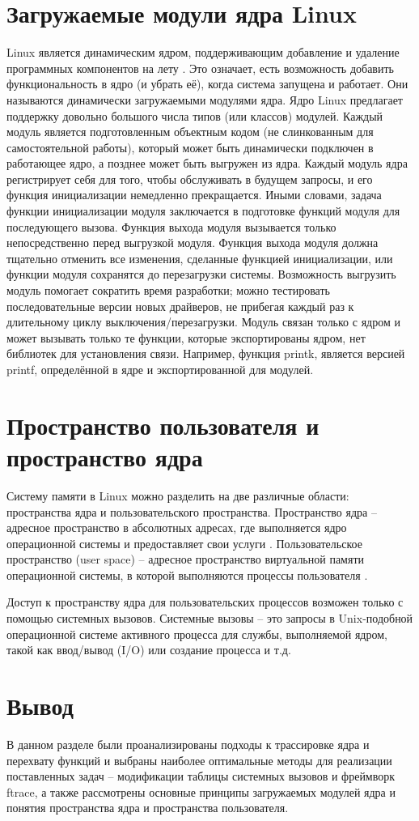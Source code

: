 \section{Загружаемые модули ядра Linux}
	Linux является динамическим ядром, 
	поддерживающим добавление и удаление программных компонентов на лету \cite{anatomy-linux-kernel}.
	Это означает, есть возможность добавить функциональность в ядро (и убрать её), когда система запущена и работает.
	Они называются динамически загружаемыми модулями ядра.
	Ядро Linux предлагает поддержку довольно большого числа типов (или классов) модулей.
	Каждый модуль является подготовленным объектным кодом (не слинкованным для самостоятельной работы),
	который может быть динамически подключен в работающее ядро, а позднее может быть выгружен из ядра.
	Каждый модуль ядра регистрирует себя для того, чтобы обслуживать в будущем запросы,
	и его функция инициализации немедленно прекращается. 
	Иными словами, задача функции инициализации модуля заключается в подготовке функций модуля для последующего вызова.
	Функция выхода модуля вызывается только непосредственно перед выгрузкой модуля. 
	Функция выхода модуля должна тщательно отменить все изменения, сделанные функцией инициализации, 
	или функции модуля сохранятся до перезагрузки системы. 
	Возможность выгрузить модуль помогает сократить время разработки; 
	можно тестировать последовательные версии новых драйверов, 
	не прибегая каждый раз к длительному циклу выключения/перезагрузки. 
	Модуль связан только с ядром и может вызывать только те функции, 
	которые экспортированы ядром, нет библиотек для установления связи. 
	Например, функция printk, является версией printf, 
	определённой в ядре и экспортированной для модулей.
	
\section{Пространство пользователя и пространство ядра}
	Систему памяти в Linux можно разделить на две различные области: пространства ядра и пользовательского пространства.
	Пространство ядра -- адресное пространство в абсолютных адресах,
	где выполняется ядро операционной системы и предоставляет свои услуги \cite{linux-kernel-space}.
	Пользовательское пространство (user space) -- адресное пространство виртуальной памяти операционной системы,
	в которой выполняются процессы пользователя \cite{linux-user-space}.
	
	Доступ к пространству ядра для пользовательских процессов возможен только с помощью системных вызовов.
	Системные вызовы -- это запросы в Unix-подобной операционной системе активного процесса для службы,
	выполняемой ядром, такой как ввод/вывод (I/O) или создание процесса и т.д.

\section{Вывод}
	В данном разделе были проанализированы подходы к трассировке ядра и перехвату функций и 
	выбраны наиболее оптимальные методы для реализации поставленных задач -- модификации таблицы
	системных вызовов и фреймворк ftrace, 
	а также рассмотрены основные принципы загружаемых модулей ядра и понятия пространства ядра и пространства пользователя.
	
\pagebreak